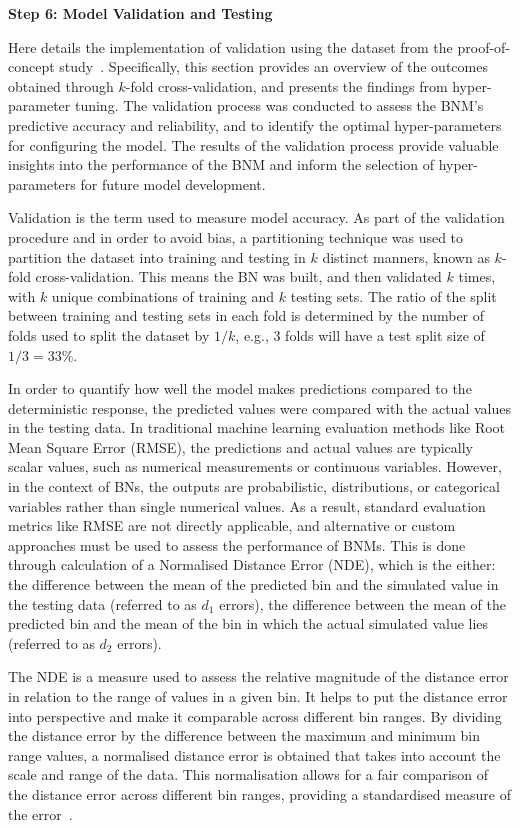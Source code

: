 \documentclass[journal]{IEEEtran}
\begin{document}
\textbf{Step 6: Model Validation and Testing}

Here details the implementation of validation using the dataset from the proof-of-concept study~\cite{Griffiths2024}. Specifically, this section provides an overview of the outcomes obtained through $k$-fold cross-validation, and presents the findings from hyper-parameter tuning. The validation process was conducted to assess the BNM's predictive accuracy and reliability, and to identify the optimal hyper-parameters for configuring the model. The results of the validation process provide valuable insights into the performance of the BNM and inform the selection of hyper-parameters for future model development.

Validation is the term used to measure model accuracy. As part of the validation procedure and in order to avoid bias, a partitioning technique was used to partition the dataset into training and testing in $k$ distinct manners, known as $k$-fold cross-validation. This means the BN was built, and then validated $k$ times, with $k$ unique combinations of training and $k$ testing sets. The ratio of the split between training and testing sets in each fold is determined by the number of folds used to split the dataset by $1/k$, e.g., 3 folds will have a test split size of $1/3 = 33\%$. 

In order to quantify how well the model makes predictions compared to the deterministic response, the predicted values were compared with the actual values in the testing data. In traditional machine learning evaluation methods like Root Mean Square Error (RMSE), the predictions and actual values are typically scalar values, such as numerical measurements or continuous variables. However, in the context of BNs, the outputs are probabilistic, distributions, or categorical variables rather than single numerical values. As a result, standard evaluation metrics like RMSE are not directly applicable, and alternative or custom approaches must be used to assess the performance of BNMs. This is done through calculation of a Normalised Distance Error (NDE), which is the either: the difference between the mean of the predicted bin and the simulated value in the testing data (referred to as $d_{1}$ errors), the difference between the mean of the predicted bin and the mean of the bin in which the actual simulated value lies (referred to as $d_{2}$ errors).

The NDE is a measure used to assess the relative magnitude of the distance error in relation to the range of values in a given bin. It helps to put the distance error into perspective and make it comparable across different bin ranges. By dividing the distance error by the difference between the maximum and minimum bin range values, a normalised distance error is obtained that takes into account the scale and range of the data. This normalisation allows for a fair comparison of the distance error across different bin ranges, providing a standardised measure of the error~\cite{Conti2019}.
\end{document}
